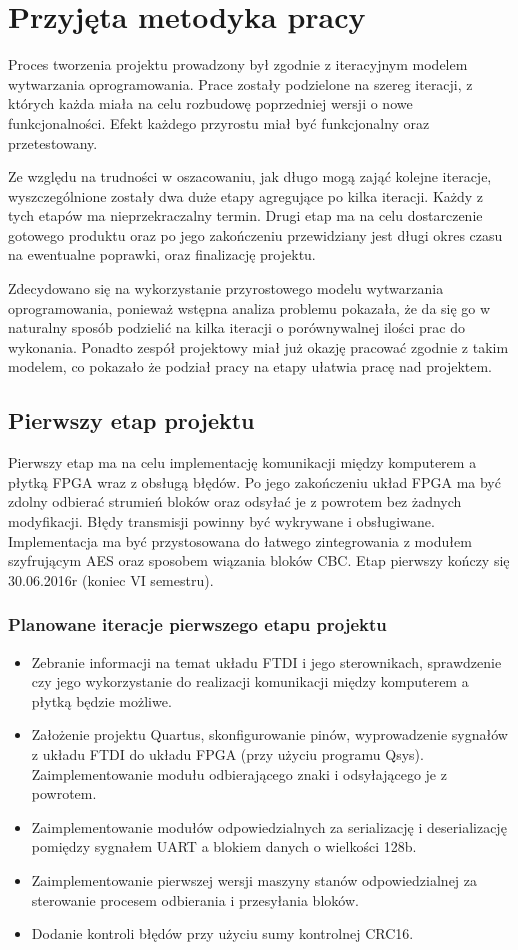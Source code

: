 \section{Przyjęta metodyka pracy}
\label{sec:przyjeta-metodyka-pracy}
Proces tworzenia projektu prowadzony był zgodnie z iteracyjnym modelem wytwarzania oprogramowania. Prace zostały podzielone na szereg iteracji, z których każda miała na celu rozbudowę poprzedniej wersji o nowe funkcjonalności. Efekt każdego przyrostu miał być funkcjonalny oraz przetestowany.

Ze względu na trudności w oszacowaniu, jak długo mogą zająć kolejne iteracje, wyszczególnione zostały dwa duże etapy agregujące po kilka iteracji. Każdy z tych etapów ma nieprzekraczalny termin. Drugi etap ma na celu dostarczenie gotowego produktu oraz po jego zakończeniu przewidziany jest długi okres czasu na ewentualne poprawki, oraz finalizację projektu.

Zdecydowano się na wykorzystanie przyrostowego modelu wytwarzania oprogramowania, ponieważ wstępna analiza problemu pokazała, że da się go w naturalny sposób podzielić na kilka iteracji o porównywalnej ilości prac do wykonania. Ponadto zespół projektowy miał już okazję pracować zgodnie z takim modelem, co pokazało że podział pracy na etapy ułatwia pracę nad projektem.

\subsection{Pierwszy etap projektu}
Pierwszy etap ma na celu implementację komunikacji między komputerem a płytką FPGA wraz z obsługą błędów. Po jego zakończeniu układ FPGA ma być zdolny odbierać strumień bloków oraz odsyłać je z powrotem bez żadnych modyfikacji. Błędy transmisji powinny być wykrywane i obsługiwane. Implementacja ma być przystosowana do łatwego zintegrowania z modułem szyfrującym AES oraz sposobem wiązania bloków CBC. Etap pierwszy kończy się 30.06.2016r (koniec VI semestru).

\subsubsection{Planowane iteracje pierwszego etapu projektu}
\begin{itemize}
\item Zebranie informacji na temat układu FTDI i jego sterownikach, sprawdzenie czy jego wykorzystanie do realizacji komunikacji między komputerem a płytką będzie możliwe.
\item Założenie projektu Quartus, skonfigurowanie pinów, wyprowadzenie sygnałów z układu FTDI do układu FPGA (przy użyciu programu Qsys). Zaimplementowanie modułu odbierającego znaki i odsyłającego je z powrotem.
\item Zaimplementowanie modułów odpowiedzialnych za serializację i deserializację pomiędzy sygnałem UART a blokiem danych o wielkości 128b.
\item Zaimplementowanie pierwszej wersji maszyny stanów odpowiedzialnej za sterowanie procesem odbierania i przesyłania bloków.
\item Dodanie kontroli błędów przy użyciu sumy kontrolnej CRC16.
\end{itemize}


